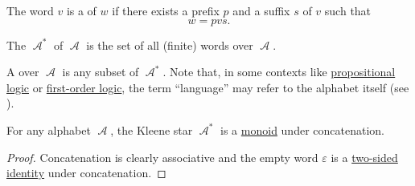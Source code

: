 \begin{definition}
\begin{thmenum}
     The word \( v \) is a  of \( w \) if there exists a prefix \( p \) and a suffix \( s \) of \( v \) such that
    \begin{equation*}
      w = pvs.
    \end{equation*}

     The  \( \mscrA^{\ast} \) of \( \mscrA \) is the set of all (finite) words over \( \mscrA \).

     A  over \( \mscrA \) is any subset of \( \mscrA^{\ast} \). Note that, in some contexts like \hyperref[subsec:propositional_logic]{propositional logic} or \hyperref[subsec:first_order_logic]{first-order logic}, the term \enquote{language} may refer to the alphabet itself (see ).
  \end{thmenum}
\end{definition}

\begin{proposition}\label{thm:kleene_star_is_monoid}
  For any alphabet \( \mscrA \), the Kleene star \( \mscrA^{\ast} \) is a \hyperref[def:unital_magma/associative]{monoid} under concatenation.
\end{proposition}
\begin{proof}
  Concatenation is clearly associative and the empty word \( \varepsilon \) is a \hyperref[def:magma_identity]{two-sided identity} under concatenation.
\end{proof}
